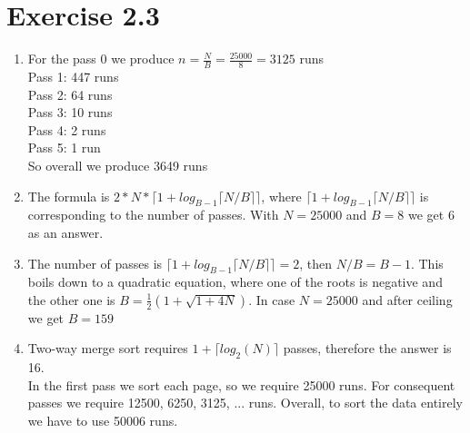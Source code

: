 \documentclass[10pt]{article}
\begin{document}
  \section*{Exercise 2.3}
   \begin{enumerate}[label=\arabic*.]
      \item
      	For the pass 0 we produce $n = \frac{N}{B} = \frac{25000}{8} = 3125$ runs\\
        Pass 1: 447 runs\\
        Pass 2: 64 runs\\
        Pass 3: 10 runs\\
        Pass 4: 2 runs\\
        Pass 5: 1 run\\[3pt]
        So overall we produce 3649 runs
      \item
        The formula is $2*N*\lceil 1+log_{B-1} \lceil N/B \rceil \rceil$, where
        $\lceil 1+log_{B-1} \lceil N/B \rceil \rceil$ is corresponding to the number
        of passes. With $N = 25000$ and $B = 8$ we get $6$ as an answer.
      \item
      	The number of passes is $\lceil 1+log_{B-1} \lceil N/B \rceil \rceil = 2$,
        then $N/B = B-1$. This boils down to a quadratic equation, where one of the
        roots is negative and the other one is $B = \frac{1}{2}(1+\sqrt{1+4N})$. In case $N = 25000$
        and after ceiling we get $B = 159$
      \item
        Two-way merge sort requires $1 + \lceil log_2(N) \rceil$ passes, therefore
        the answer is 16. \\
        In the first pass we sort each page, so we require 25000 runs. For consequent passes we require 12500, 6250, 3125, ... runs. Overall, to sort the data entirely we have to use 50006 runs.
  \end{enumerate}
\end{document}
